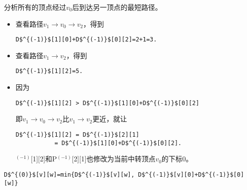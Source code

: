 \begin{frame}[fragile]\ft{\subsubsecname}
分析所有的顶点经过$v_0$后到达另一顶点的最短路径。
\begin{itemize}
\item 查看路径$v_1\to v_0\to v_2$，得到
\begin{lstlisting}[mathescape]
D$^{(-1)}$[1][0]+D$^{(-1)}$[0][2]=2+1=3.
\end{lstlisting}
\item 查看路径$v_1\to  v_2$，得到
\begin{lstlisting}[mathescape]
D$^{(-1)}$[1][2]=5.
\end{lstlisting}
\item 因为
\begin{lstlisting}[mathescape]
D$^{(-1)}$[1][2] > D$^{(-1)}$[1][0]+D$^{(-1)}$[0][2] 
\end{lstlisting}
即$v_1\to v_0\to v_2$比$v_1\to  v_2$更近，就让
\begin{lstlisting}[mathescape]
D$^{(-1)}$[1][2] = D$^{(-1)}$[2][1] 
           = D$^{(-1)}$[1][0]+D$^{(-1)}$[0][2].
\end{lstlisting}
$^{(-1)}$[1][2]和P$^{(-1)}$[2][1]也修改为当前中转顶点$v_0$的下标0。
\end{itemize}

\end{frame}





\begin{frame}[fragile]\ft{\subsubsecname}
\begin{lstlisting}[mathescape]
D$^{(0)}$[v][w]=min{D$^{(-1)}$[v][w], D$^{(-1)}$[v][0]+D$^{(-1)}$[0][w]}
\end{lstlisting}
\end{frame}




\begin{frame}\ft{\subsubsecname}
\begin{figure}
\centering

\end{figure}
\end{frame}


\begin{frame}\ft{\subsubsecname}

\end{frame}

\begin{frame}\ft{\subsubsecname}

\end{frame}

